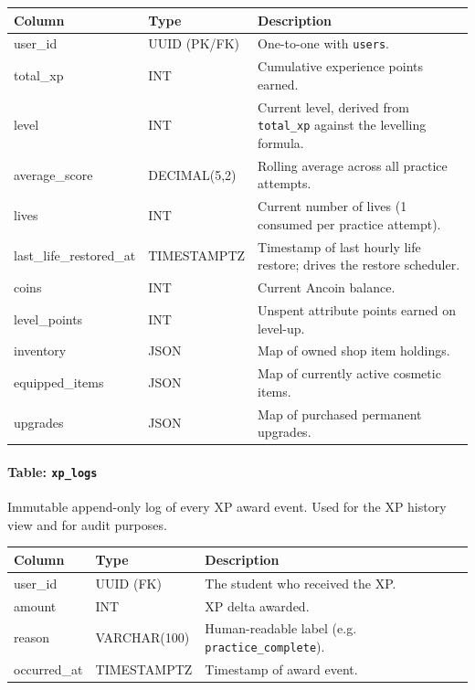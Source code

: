 \begin{longtable}{|p{4.5cm}|p{3cm}|p{6cm}|}
\hline \textbf{Column} & \textbf{Type} & \textbf{Description} \\ \hline
user\_id & UUID (PK/FK) & One-to-one with \texttt{users}. \\ \hline
total\_xp & INT & Cumulative experience points earned. \\ \hline
level & INT & Current level, derived from \texttt{total\_xp} against the levelling formula. \\ \hline
average\_score & DECIMAL(5,2) & Rolling average across all practice attempts. \\ \hline
lives & INT & Current number of lives (1 consumed per practice attempt). \\ \hline
last\_life\_restored\_at & TIMESTAMPTZ & Timestamp of last hourly life restore; drives the restore scheduler. \\ \hline
coins & INT & Current Ancoin balance. \\ \hline
level\_points & INT & Unspent attribute points earned on level-up. \\ \hline
inventory & JSON & Map of owned shop item holdings. \\ \hline
equipped\_items & JSON & Map of currently active cosmetic items. \\ \hline
upgrades & JSON & Map of purchased permanent upgrades. \\ \hline
\end{longtable}

\paragraph{Table: \texttt{xp\_logs}}
Immutable append-only log of every XP award event. Used for the XP history view and for audit purposes.

\begin{longtable}{|p{4.2cm}|p{3cm}|p{6.8cm}|}
\hline \textbf{Column} & \textbf{Type} & \textbf{Description} \\ \hline
user\_id & UUID (FK) & The student who received the XP. \\ \hline
amount & INT & XP delta awarded. \\ \hline
reason & VARCHAR(100) & Human-readable label (e.g. \texttt{practice\_complete}). \\ \hline
occurred\_at & TIMESTAMPTZ & Timestamp of award event. \\ \hline
\end{longtable}

